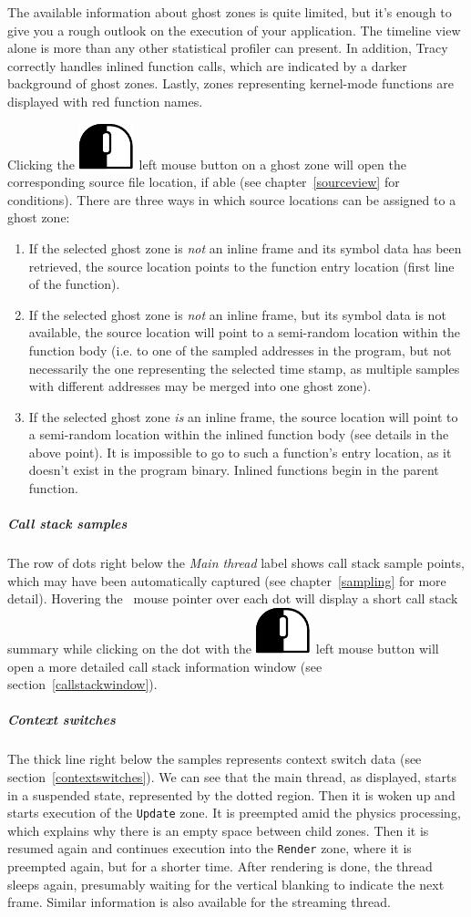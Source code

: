 \documentclass[hidelinks,titlepage,a4paper]{article}
\newcommand{\LMB}{\includegraphics[height=.8\baselineskip]{icons/lmb}}
\begin{document}
The available information about ghost zones is quite limited, but it's enough to give you a rough outlook on the execution of your application. The timeline view alone is more than any other statistical profiler can present. In addition, Tracy correctly handles inlined function calls, which are indicated by a darker background of ghost zones. Lastly, zones representing kernel-mode functions are displayed with red function names.

Clicking the \LMB{}~left mouse button on a ghost zone will open the corresponding source file location, if able (see chapter~\ref{sourceview} for conditions). There are three ways in which source locations can be assigned to a ghost zone:

\begin{enumerate}
\item If the selected ghost zone is \emph{not} an inline frame and its symbol data has been retrieved, the source location points to the function entry location (first line of the function).
\item If the selected ghost zone is \emph{not} an inline frame, but its symbol data is not available, the source location will point to a semi-random location within the function body (i.e. to one of the sampled addresses in the program, but not necessarily the one representing the selected time stamp, as multiple samples with different addresses may be merged into one ghost zone).
\item If the selected ghost zone \emph{is} an inline frame, the source location will point to a semi-random location within the inlined function body (see details in the above point). It is impossible to go to such a function's entry location, as it doesn't exist in the program binary. Inlined functions begin in the parent function.
\end{enumerate}

\subparagraph{Call stack samples}

The row of dots right below the \emph{Main thread} label shows call stack sample points, which may have been automatically captured (see chapter~\ref{sampling} for more detail). Hovering the \faMousePointer{}~mouse pointer over each dot will display a short call stack summary while clicking on the dot with the \LMB{}~left mouse button will open a more detailed call stack information window (see section~\ref{callstackwindow}).

\subparagraph{Context switches}

The thick line right below the samples represents context switch data (see section~\ref{contextswitches}). We can see that the main thread, as displayed, starts in a suspended state, represented by the dotted region. Then it is woken up and starts execution of the \texttt{Update} zone. It is preempted amid the physics processing, which explains why there is an empty space between child zones. Then it is resumed again and continues execution into the \texttt{Render} zone, where it is preempted again, but for a shorter time. After rendering is done, the thread sleeps again, presumably waiting for the vertical blanking to indicate the next frame. Similar information is also available for the streaming thread.
\end{document}
